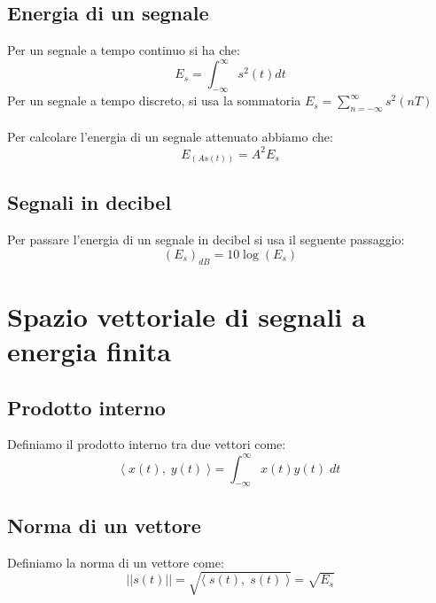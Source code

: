 \documentclass{article}
\begin{document}
\newpage
\subsection{Energia di un segnale}
Per un segnale a tempo continuo si ha che:
$$E_s=\int_{-\infty}^{\infty}s^2(t)dt$$
Per un segnale a tempo discreto, si usa la sommatoria $E_s=\sum_{n=-\infty}^{\infty}s^2(nT)$\\\\
Per calcolare l'energia di un segnale attenuato abbiamo che:
$$E_{(As(t))}=A^2E_s$$

\subsection{Segnali in decibel}
Per passare l'energia di un segnale in decibel si usa il seguente passaggio:
$$(E_s)_{dB}=10\log(E_s)$$











\newpage
\section{Spazio vettoriale di segnali a energia finita}

\subsection{Prodotto interno}
Definiamo il prodotto interno tra due vettori come:
$$\langle\;x(t),\;y(t)\;\rangle=\int_{-\infty}^{\infty}x(t)y(t)\;dt$$

\subsection{Norma di un vettore}
Definiamo la norma di un vettore come:
$$||s(t)||=\sqrt{\langle\;s(t),\;s(t)\;\rangle}=\sqrt{E_s}$$
\end{document}
